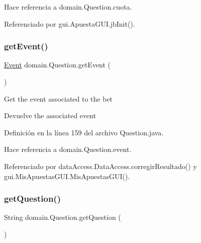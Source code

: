 Hace referencia a domain.\+Question.\+cuota.



Referenciado por gui.\+Apuesta\+G\+U\+I.\+jb\+Init().

\mbox{\label{classdomain_1_1Question_a79d1d7cbea1d099aef2e77f4d338c17f}} 
\subsubsection{\texorpdfstring{getEvent()}{getEvent()}}
{\footnotesize\ttfamily \mbox{\hyperlink{classdomain_1_1Event}{Event}} domain.\+Question.\+get\+Event (\begin{DoxyParamCaption}{ }\end{DoxyParamCaption})}

Get the event associated to the bet

\begin{DoxyReturn}{Devuelve}
the associated event 
\end{DoxyReturn}


Definición en la línea 159 del archivo Question.\+java.


\begin{DoxyCode}{0}

\end{DoxyCode}


Hace referencia a domain.\+Question.\+event.



Referenciado por data\+Access.\+Data\+Access.\+corregir\+Resultado() y gui.\+Mis\+Apuestas\+G\+U\+I.\+Mis\+Apuestas\+G\+U\+I().

\mbox{\label{classdomain_1_1Question_a59bf69a5982ce79e89599ffe17c89790}} 
\subsubsection{\texorpdfstring{getQuestion()}{getQuestion()}}
{\footnotesize\ttfamily String domain.\+Question.\+get\+Question (\begin{DoxyParamCaption}{ }\end{DoxyParamCaption})}

